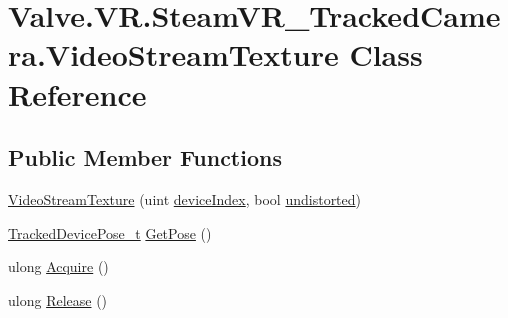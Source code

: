 \hypertarget{class_valve_1_1_v_r_1_1_steam_v_r___tracked_camera_1_1_video_stream_texture}{}\section{Valve.\+V\+R.\+Steam\+V\+R\+\_\+\+Tracked\+Camera.\+Video\+Stream\+Texture Class Reference}
\label{class_valve_1_1_v_r_1_1_steam_v_r___tracked_camera_1_1_video_stream_texture}
\subsection*{Public Member Functions}
\begin{DoxyCompactItemize}
\item 
\mbox{\hyperlink{class_valve_1_1_v_r_1_1_steam_v_r___tracked_camera_1_1_video_stream_texture_a3698416efc663ab4a07bdf2c7778a235}{Video\+Stream\+Texture}} (uint \mbox{\hyperlink{class_valve_1_1_v_r_1_1_steam_v_r___tracked_camera_1_1_video_stream_texture_a6ea68ffe28dad910b43405c79984322a}{device\+Index}}, bool \mbox{\hyperlink{class_valve_1_1_v_r_1_1_steam_v_r___tracked_camera_1_1_video_stream_texture_a56cd0bedd92d337384c2639142df95cd}{undistorted}})
\item 
\mbox{\hyperlink{struct_valve_1_1_v_r_1_1_tracked_device_pose__t}{Tracked\+Device\+Pose\+\_\+t}} \mbox{\hyperlink{class_valve_1_1_v_r_1_1_steam_v_r___tracked_camera_1_1_video_stream_texture_ab7d12d609974b8a51eed40528a98fad8}{Get\+Pose}} ()
\item 
ulong \mbox{\hyperlink{class_valve_1_1_v_r_1_1_steam_v_r___tracked_camera_1_1_video_stream_texture_a6a66f017f4f3287adb4d8c13cceef21f}{Acquire}} ()
\item 
ulong \mbox{\hyperlink{class_valve_1_1_v_r_1_1_steam_v_r___tracked_camera_1_1_video_stream_texture_a0facad167caddd1d7c44f71ffb616922}{Release}} ()
\end{DoxyCompactItemize}

